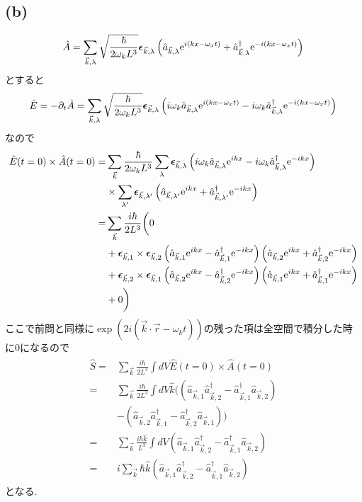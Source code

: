 \documentclass[uplatex,a4j,11pt,dvipdfmx]{jsarticle}
\begin{document}
\subsection*{(b)}
\begin{align*}
  \hat{A}=\sum_{\vec{k},\lambda}\sqrt{\frac{\hbar}{2\omega_kL^3}}{\bm \epsilon}_{\vec{k},\lambda}\left(\hat{a}_{\vec{k},\lambda}{\rm e}^{i(kx-\omega_xt)}+\hat{a}_{\vec{k},\lambda}^\dagger{\rm e}^{-i(kx-\omega_xt)}\right)
\end{align*}
とすると
\begin{align*}
  \hat{E}=-\partial_t\hat{A}=\sum_{\vec{k},\lambda}\sqrt{\frac{\hbar}{2\omega_kL^3}}{\bm \epsilon}_{\vec{k},\lambda}\left(i\omega_k\hat{a}_{\vec{k},\lambda}{\rm e}^{i(kx-\omega_xt)}-i\omega_k\hat{a}_{\vec{k},\lambda}^\dagger{\rm e}^{-i(kx-\omega_xt)}\right)
\end{align*}
なので
\begin{align*}
  \hat{E}(t=0)\times\hat{A}(t=0)=&\sum_{\vec{k}}\frac{\hbar}{2\omega_kL^3}\sum_\lambda{\bm \epsilon}_{\vec{k},\lambda}\left(i\omega_k\hat{a}_{\vec{k},\lambda}{\rm e}^{ikx}-i\omega_k\hat{a}_{\vec{k},\lambda}^\dagger{\rm e}^{-ikx}\right)\\
  &\times\sum_{\lambda'}{\bm \epsilon}_{\vec{k},\lambda'}\left(\hat{a}_{\vec{k},\lambda'}{\rm e}^{ikx}+\hat{a}_{\vec{k},\lambda'}^\dagger{\rm e}^{-ikx}\right)\\
  =&\sum_{\vec{k}}\frac{i\hbar}{2L^3}\biggl(0\\
  &+{\bm \epsilon}_{\vec{k},1}\times{\bm \epsilon}_{\vec{k},2}\left(\hat{a}_{\vec{k},1}{\rm e}^{ikx}-\hat{a}_{\vec{k},1}^\dagger{\rm e}^{-ikx}\right)\left(\hat{a}_{\vec{k},2}{\rm e}^{ikx}+\hat{a}_{\vec{k},2}^\dagger{\rm e}^{-ikx}\right)\\
  &+{\bm \epsilon}_{\vec{k},2}\times{\bm \epsilon}_{\vec{k},1}\left(\hat{a}_{\vec{k},2}{\rm e}^{ikx}-\hat{a}_{\vec{k},2}^\dagger{\rm e}^{-ikx}\right)\left(\hat{a}_{\vec{k},1}{\rm e}^{ikx}+\hat{a}_{\vec{k},1}^\dagger{\rm e}^{-ikx}\right)\\
  &+0\biggr)
\end{align*}
ここで前問と同様に$\exp(2i(\vec{k}\cdot\vec{r}-\omega_kt))$の残った項は全空間で積分した時に0になるので
\begin{align}
  \begin{split}
    \hat{S}=&\sum_{\vec{k}}\frac{i\hbar}{2L^3}\int dV\hat{E}(t=0)\times\hat{A}(t=0)\\
    =&\sum_{\vec{k}}\frac{i\hbar}{2L^3}\int dV\hat{k}\biggl(\left(\hat{a}_{\vec{k},1}\hat{a}_{\vec{k},2}^\dagger-\hat{a}_{\vec{k},1}^\dagger\hat{a}_{\vec{k},2}\right)\\
    &-\left(\hat{a}_{\vec{k},2}\hat{a}_{\vec{k},1}^\dagger-\hat{a}_{\vec{k},2}^\dagger\hat{a}_{\vec{k},1}\right)\biggr)\\
    =&\sum_{\vec{k}}\frac{i\hbar\hat{k}}{L^3}\int dV\left(\hat{a}_{\vec{k},1}\hat{a}_{\vec{k},2}^\dagger-\hat{a}_{\vec{k},1}^\dagger\hat{a}_{\vec{k},2}\right)\\
    =&i\sum_{\vec{k}}\hbar\hat{k}\left(\hat{a}_{\vec{k},1}\hat{a}_{\vec{k},2}^\dagger-\hat{a}_{\vec{k},1}^\dagger\hat{a}_{\vec{k},2}\right)
  \end{split}
\end{align}
となる.
\end{document}
